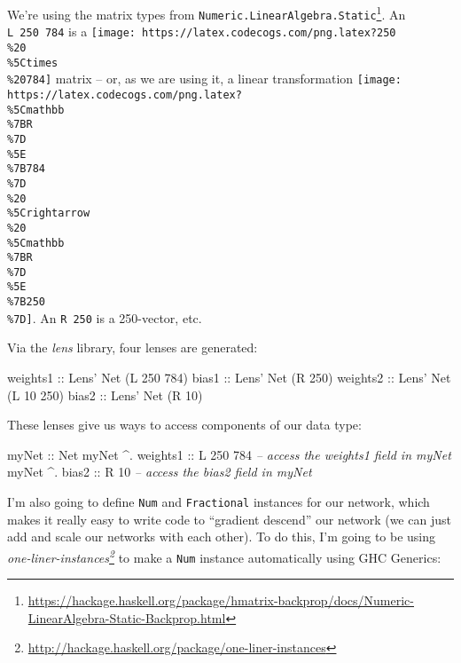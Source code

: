 \documentclass[]{article}
\newenvironment{Shaded}{}{}
\newcommand{\CommentTok}[1]{\textcolor[rgb]{0.38,0.63,0.69}{\textit{#1}}}
\newcommand{\DataTypeTok}[1]{\textcolor[rgb]{0.56,0.13,0.00}{#1}}
\newcommand{\DecValTok}[1]{\textcolor[rgb]{0.25,0.63,0.44}{#1}}
\newcommand{\FunctionTok}[1]{\textcolor[rgb]{0.02,0.16,0.49}{#1}}
\newcommand{\NormalTok}[1]{#1}
\newcommand{\OtherTok}[1]{\textcolor[rgb]{0.00,0.44,0.13}{#1}}
\renewcommand{\href}[2]{#2\footnote{\url{#1}}}
\begin{document}
We're using the matrix types from
\href{https://hackage.haskell.org/package/hmatrix-backprop/docs/Numeric-LinearAlgebra-Static-Backprop.html}{\texttt{Numeric.LinearAlgebra.Static}}.
An \texttt{L\ 250\ 784} is a
\texttt{[image: https://latex.codecogs.com/png.latex?250\\\%20\\\%5Ctimes\\\%20784]}
matrix -- or, as we are using it, a linear transformation
\texttt{[image: https://latex.codecogs.com/png.latex?\\\%5Cmathbb\\\%7BR\\\%7D\\\%5E\\\%7B784\\\%7D\\\%20\\\%5Crightarrow\\\%20\\\%5Cmathbb\\\%7BR\\\%7D\\\%5E\\\%7B250\\\%7D]}.
An \texttt{R\ 250} is a 250-vector, etc.

Via the \emph{lens} library, four lenses are generated:

\begin{Shaded}
\begin{Highlighting}[]
\OtherTok{weights1 ::} \DataTypeTok{Lens'} \DataTypeTok{Net}\NormalTok{ (}\DataTypeTok{L} \DecValTok{250} \DecValTok{784}\NormalTok{)}
\OtherTok{bias1    ::} \DataTypeTok{Lens'} \DataTypeTok{Net}\NormalTok{ (}\DataTypeTok{R} \DecValTok{250}\NormalTok{)}
\OtherTok{weights2 ::} \DataTypeTok{Lens'} \DataTypeTok{Net}\NormalTok{ (}\DataTypeTok{L} \DecValTok{10}  \DecValTok{250}\NormalTok{)}
\OtherTok{bias2    ::} \DataTypeTok{Lens'} \DataTypeTok{Net}\NormalTok{ (}\DataTypeTok{R} \DecValTok{10}\NormalTok{)}
\end{Highlighting}
\end{Shaded}

These lenses give us ways to access components of our data type:

\begin{Shaded}
\begin{Highlighting}[]
\OtherTok{myNet             ::} \DataTypeTok{Net}
\NormalTok{myNet }\FunctionTok{^.}\OtherTok{ weights1 ::} \DataTypeTok{L} \DecValTok{250} \DecValTok{784}  \CommentTok{-- access the weights1 field in myNet}
\NormalTok{myNet }\FunctionTok{^.}\OtherTok{ bias2    ::} \DataTypeTok{R}  \DecValTok{10}      \CommentTok{-- access the bias2 field in myNet}
\end{Highlighting}
\end{Shaded}

I'm also going to define \texttt{Num} and \texttt{Fractional} instances for our
network, which makes it really easy to write code to ``gradient descend'' our
network (we can just add and scale our networks with each other). To do this,
I'm going to be using
\emph{\href{http://hackage.haskell.org/package/one-liner-instances}{one-liner-instances}}
to make a \texttt{Num} instance automatically using GHC Generics:
\end{document}
